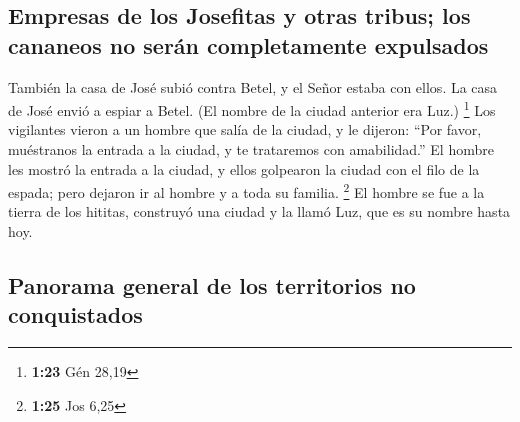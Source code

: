 \hypertarget{empresas-de-los-josefitas-y-otras-tribus-los-cananeos-no-seruxe1n-completamente-expulsados}{%
\subsection{Empresas de los Josefitas y otras tribus; los cananeos no
serán completamente
expulsados}\label{empresas-de-los-josefitas-y-otras-tribus-los-cananeos-no-seruxe1n-completamente-expulsados}}

 También la casa de José subió contra Betel, y el Señor
estaba con ellos.  La casa de José envió a espiar a
Betel. (El nombre de la ciudad anterior era Luz.) \footnote{\textbf{1:23}
  Gén 28,19}  Los vigilantes vieron a un hombre que salía
de la ciudad, y le dijeron: ``Por favor, muéstranos la entrada a la
ciudad, y te trataremos con amabilidad.''  El hombre les
mostró la entrada a la ciudad, y ellos golpearon la ciudad con el filo
de la espada; pero dejaron ir al hombre y a toda su familia. \footnote{\textbf{1:25}
  Jos 6,25}  El hombre se fue a la tierra de los hititas,
construyó una ciudad y la llamó Luz, que es su nombre hasta hoy.

\hypertarget{panorama-general-de-los-territorios-no-conquistados}{%
\subsection{Panorama general de los territorios no
conquistados}\label{panorama-general-de-los-territorios-no-conquistados}}

